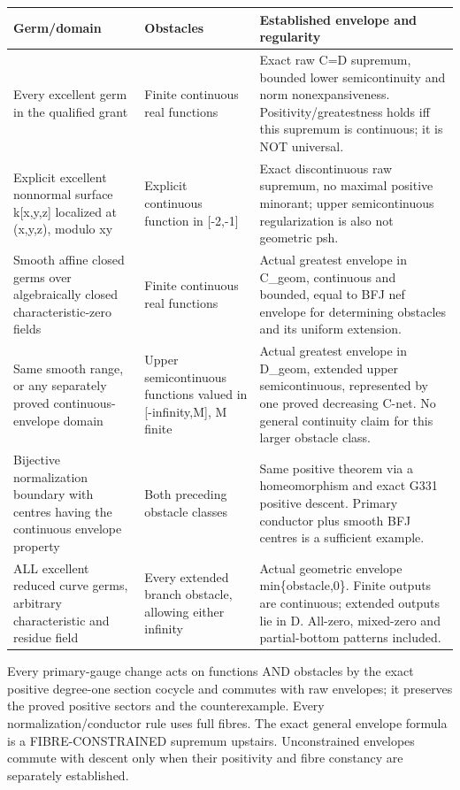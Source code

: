\documentclass[11pt]{article}
\begin{document}
\small\begin{longtable}{p{4.47cm}p{4.47cm}p{4.47cm}}
Germ/domain & Obstacles & Established envelope and regularity \\
\hline
Every excellent germ in the qualified grant & Finite continuous real functions & Exact raw C=D supremum, bounded lower semicontinuity and norm nonexpansiveness. Positivity/greatestness holds iff this supremum is continuous; it is NOT universal. \\
Explicit excellent nonnormal surface k[x,y,z] localized at (x,y,z), modulo xy & Explicit continuous function in [-2,-1] & Exact discontinuous raw supremum, no maximal positive minorant; upper semicontinuous regularization is also not geometric psh. \\
Smooth affine closed germs over algebraically closed characteristic-zero fields & Finite continuous real functions & Actual greatest envelope in C\_geom, continuous and bounded, equal to BFJ nef envelope for determining obstacles and its uniform extension. \\
Same smooth range, or any separately proved continuous-envelope domain & Upper semicontinuous functions valued in [-infinity,M], M finite & Actual greatest envelope in D\_geom, extended upper semicontinuous, represented by one proved decreasing C-net. No general continuity claim for this larger obstacle class. \\
Bijective normalization boundary with centres having the continuous envelope property & Both preceding obstacle classes & Same positive theorem via a homeomorphism and exact G331 positive descent. Primary conductor plus smooth BFJ centres is a sufficient example. \\
ALL excellent reduced curve germs, arbitrary characteristic and residue field & Every extended branch obstacle, allowing either infinity & Actual geometric envelope min\{obstacle,0\}. Finite outputs are continuous; extended outputs lie in D. All-zero, mixed-zero and partial-bottom patterns included. \\
\end{longtable}\normalsize

Every primary-gauge change acts on functions AND obstacles by the exact positive degree-one section cocycle and commutes with raw envelopes; it preserves the proved positive sectors and the counterexample. Every normalization/conductor rule uses full fibres. The exact general envelope formula is a FIBRE-CONSTRAINED supremum upstairs. Unconstrained envelopes commute with descent only when their positivity and fibre constancy are separately established.
\end{document}
